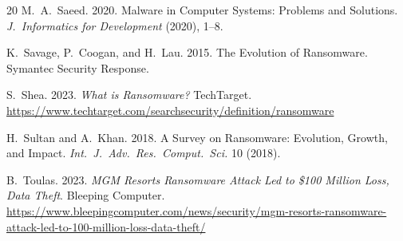 \documentclass[sigconf,nonacm]{acmart}
\begin{document}
\begin{thebibliography}{20}
M.~A.~Saeed. 2020. Malware in Computer Systems: Problems and Solutions. \textit{J.\
Informatics for Development} (2020), 1--8.

K.~Savage, P.~Coogan, and H.~Lau. 2015. The Evolution of Ransomware. Symantec Security
Response.

S.~Shea. 2023. \textit{What is Ransomware?} TechTarget.
\url{https://www.techtarget.com/searchsecurity/definition/ransomware}

H.~Sultan and A.~Khan. 2018. A Survey on Ransomware: Evolution, Growth, and Impact.
\textit{Int.\ J.\ Adv.\ Res.\ Comput.\ Sci.} 10 (2018).

B.~Toulas. 2023. \textit{MGM Resorts Ransomware Attack Led to \$100 Million Loss, Data
Theft}. Bleeping Computer.
\url{https://www.bleepingcomputer.com/news/security/mgm-resorts-ransomware-attack-led-to-100-million-loss-data-theft/}

\end{thebibliography}
\end{document}
